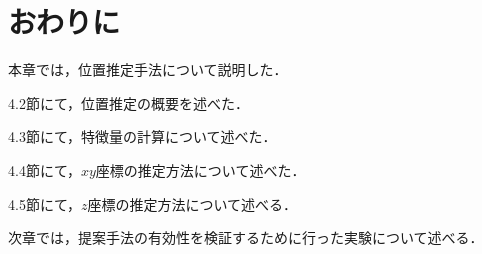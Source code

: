 \clearpage
\section{おわりに}

本章では，位置推定手法について説明した．

4.2節にて，位置推定の概要を述べた．

4.3節にて，特徴量の計算について述べた．

4.4節にて，$xy$座標の推定方法について述べた．

4.5節にて，$z$座標の推定方法について述べる．


次章では，提案手法の有効性を検証するために行った実験について述べる．

\clearpage
